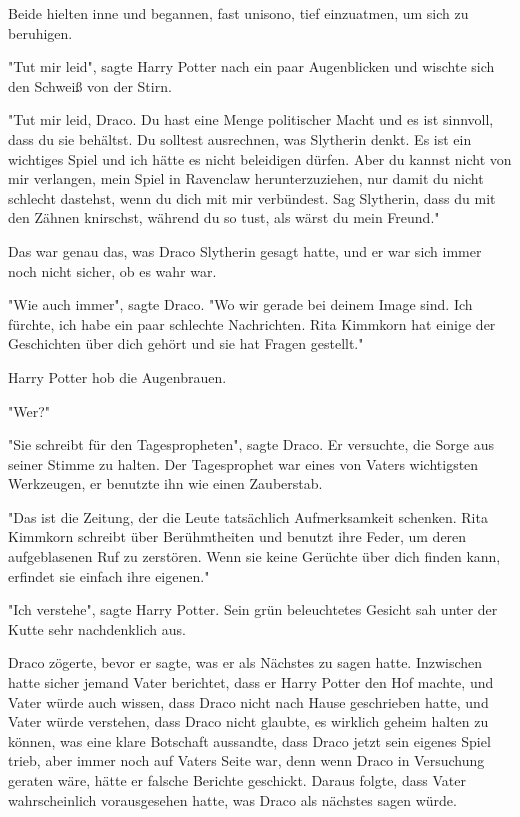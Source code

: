 {Beide hielten inne und begannen, fast unisono, tief einzuatmen, um sich zu beruhigen.

"Tut mir leid", sagte Harry Potter nach ein paar Augenblicken und wischte sich den Schweiß von der Stirn.

"Tut mir leid, Draco. Du hast eine Menge politischer Macht und es ist sinnvoll, dass du sie behältst. Du solltest ausrechnen, was Slytherin denkt. Es ist ein wichtiges Spiel und ich hätte es nicht beleidigen dürfen. Aber du kannst nicht von mir verlangen, mein Spiel in Ravenclaw herunterzuziehen, nur damit du nicht schlecht dastehst, wenn du dich mit mir verbündest. Sag Slytherin, dass du mit den Zähnen knirschst, während du so tust, als wärst du mein Freund."

Das war genau das, was Draco Slytherin gesagt hatte, und er war sich immer noch nicht sicher, ob es wahr war.

"Wie auch immer", sagte Draco. "Wo wir gerade bei deinem Image sind. Ich fürchte, ich habe ein paar schlechte Nachrichten. Rita Kimmkorn hat einige der Geschichten über dich gehört und sie hat Fragen gestellt."

Harry Potter hob die Augenbrauen.

"Wer?"

"Sie schreibt für den Tagespropheten", sagte Draco. Er versuchte, die Sorge aus seiner Stimme zu halten. Der Tagesprophet war eines von Vaters wichtigsten Werkzeugen, er benutzte ihn wie einen Zauberstab.

"Das ist die Zeitung, der die Leute tatsächlich Aufmerksamkeit schenken. Rita Kimmkorn schreibt über Berühmtheiten und benutzt ihre Feder, um deren aufgeblasenen Ruf zu zerstören. Wenn sie keine Gerüchte über dich finden kann, erfindet sie einfach ihre eigenen."

"Ich verstehe", sagte Harry Potter. Sein grün beleuchtetes Gesicht sah unter der Kutte sehr nachdenklich aus.

Draco zögerte, bevor er sagte, was er als Nächstes zu sagen hatte. Inzwischen hatte sicher jemand Vater berichtet, dass er Harry Potter den Hof machte, und Vater würde auch wissen, dass Draco nicht nach Hause geschrieben hatte, und Vater würde verstehen, dass Draco nicht glaubte, es wirklich geheim halten zu können, was eine klare Botschaft aussandte, dass Draco jetzt sein eigenes Spiel trieb, aber immer noch auf Vaters Seite war, denn wenn Draco in Versuchung geraten wäre, hätte er falsche Berichte geschickt. Daraus folgte, dass Vater wahrscheinlich vorausgesehen hatte, was Draco als nächstes sagen würde.

}
